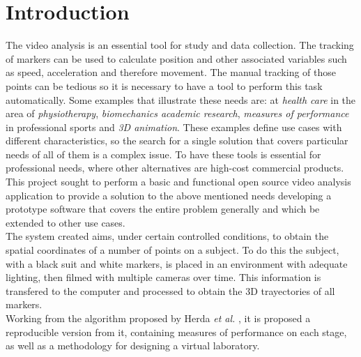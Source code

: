 \section{Introduction}

The video analysis is an essential tool for study and data collection. The tracking of markers can be used to calculate position and other associated variables such as speed, acceleration and therefore movement.
The manual tracking of those points can be tedious so it is necessary to have a tool to perform this task automatically. 
Some examples that illustrate these needs are: at \emph{health care} in the area of \emph{physiotherapy}, \emph{biomechanics academic research},
\emph{measures of performance} in professional sports and \emph{3D animation}.
These examples define use cases with different characteristics, so the search for a single solution that covers particular needs of all of them is a complex issue. To have these tools is essential for professional needs, where other alternatives are high-cost commercial products.\\
\hspace*{0.5cm}This project sought to perform a basic and functional open source video analysis application to provide a solution to the above mentioned needs developing a prototype software that covers the entire problem generally and which be extended to other use cases.\\
\hspace*{0.5cm}The system created aims, under certain controlled conditions, to obtain the spatial coordinates of a number of points on a subject. To do this the subject, with a black suit and white markers, is placed in an environment with adequate lighting, then filmed with multiple cameras over time. This information is transfered to the computer and processed to obtain the 3D trayectories of all markers.\\
\hspace*{0.5cm}Working from the algorithm proposed by Herda \textit{et al.} \cite{herda}, it is proposed a reproducible version from it, containing measures of performance on each stage, as well as a methodology for designing a virtual laboratory.

